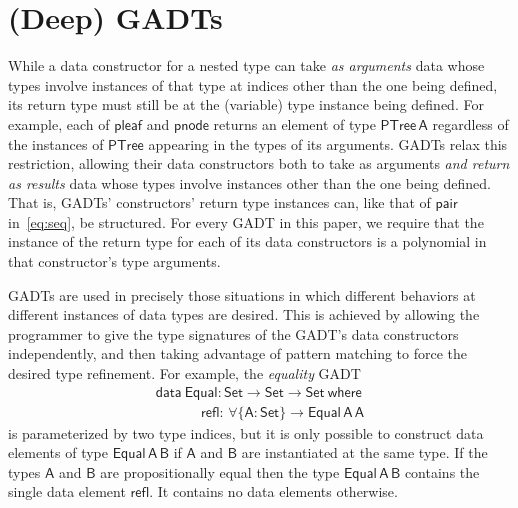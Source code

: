 \documentclass[9pt]{entcs}
\begin{document}
\section{(Deep) GADTs}\label{sec:GADTs}

While a data constructor for a nested type can take {\em as arguments}
data whose types involve instances of that type at indices other than
the one being defined, its return type must still be at the (variable)
type instance being defined. For example, each of $\mathsf{pleaf}$ and
$\mathsf{pnode}$ returns an element of type $\mathsf{PTree\,A}$
regardless of the instances of $\mathsf{PTree}$ appearing in the types
of its arguments. GADTs relax this restriction, allowing their data
constructors both to take as arguments \emph{and return as results}
data whose types involve instances other than the one being
defined. That is, GADTs' constructors' return type instances can, like
that of $\mathsf{pair}$ in~\eqref{eq:seq}, be structured.  For every
GADT in this paper, we require that the instance of the return type
for each of its data constructors is a polynomial in that
constructor's type arguments.
%

GADTs are used in precisely those situations in which different
behaviors at different instances of data types are desired. This is
achieved by allowing the programmer to give the type signatures of the
GADT's data constructors independently, and then taking advantage of
pattern matching to force the desired type refinement. For example,
the {\em equality} GADT
\begin{equation}\label{eq:equal}
\begin{array}{l}
\mathsf{data\ Equal : Set \to Set \to Set\ where}\\
\mathsf{\;\;\;\;\;\;\;\;\;\;\;\,refl :\, \forall \{A : Set\} \to Equal\,A\,A}
\end{array}
\end{equation}
is parameterized by two type indices, but it is only possible to
construct data elements of type $\mathsf{Equal\,A\,B}$ if $\mathsf{A}$
and $\mathsf{B}$ are instantiated at the same type. If the types
$\mathsf{A}$ and $\mathsf{B}$ are {\color{red} propositionally equal}
then the
type $\mathsf{Equal\,A\,B}$ contains the single data element
$\mathsf{refl}$. It contains no data elements otherwise.
\end{document}
